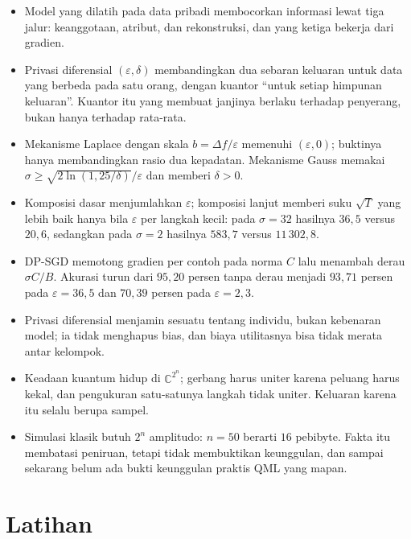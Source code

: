 \begin{ringkasan}
\begin{itemize}
  \item Model yang dilatih pada data pribadi membocorkan informasi lewat tiga jalur:
        keanggotaan, atribut, dan rekonstruksi, dan yang ketiga bekerja dari gradien.
  \item Privasi diferensial $(\varepsilon,\delta)$ membandingkan dua sebaran keluaran
        untuk data yang berbeda pada satu orang, dengan kuantor ``untuk setiap himpunan
        keluaran''. Kuantor itu yang membuat janjinya berlaku terhadap penyerang, bukan
        hanya terhadap rata-rata.
  \item Mekanisme Laplace dengan skala $b=\Delta f/\varepsilon$ memenuhi
        $(\varepsilon,0)$; buktinya hanya membandingkan rasio dua kepadatan. Mekanisme
        Gauss memakai $\sigma\ge\sqrt{2\ln(1{,}25/\delta)}/\varepsilon$ dan memberi
        $\delta>0$.
  \item Komposisi dasar menjumlahkan $\varepsilon$; komposisi lanjut memberi suku
        $\sqrt{T}$ yang lebih baik hanya bila $\varepsilon$ per langkah kecil: pada
        $\sigma=32$ hasilnya $36{,}5$ versus $20{,}6$, sedangkan pada $\sigma=2$
        hasilnya $583{,}7$ versus $11\,302{,}8$.
  \item DP-SGD memotong gradien per contoh pada norma $C$ lalu menambah derau
        $\sigma C/B$. Akurasi turun dari $95{,}20$ persen tanpa derau menjadi $93{,}71$
        persen pada $\varepsilon=36{,}5$ dan $70{,}39$ persen pada $\varepsilon=2{,}3$.
  \item Privasi diferensial menjamin sesuatu tentang individu, bukan kebenaran model;
        ia tidak menghapus bias, dan biaya utilitasnya bisa tidak merata antar kelompok.
  \item Keadaan kuantum hidup di $\mathbb{C}^{2^{n}}$; gerbang harus uniter karena
        peluang harus kekal, dan pengukuran satu-satunya langkah tidak uniter. Keluaran
        karena itu selalu berupa sampel.
  \item Simulasi klasik butuh $2^{n}$ amplitudo: $n=50$ berarti $16$ pebibyte. Fakta itu
        membatasi peniruan, tetapi tidak membuktikan keunggulan, dan sampai sekarang
        belum ada bukti keunggulan praktis QML yang mapan.
\end{itemize}
\end{ringkasan}

\section{Latihan}

